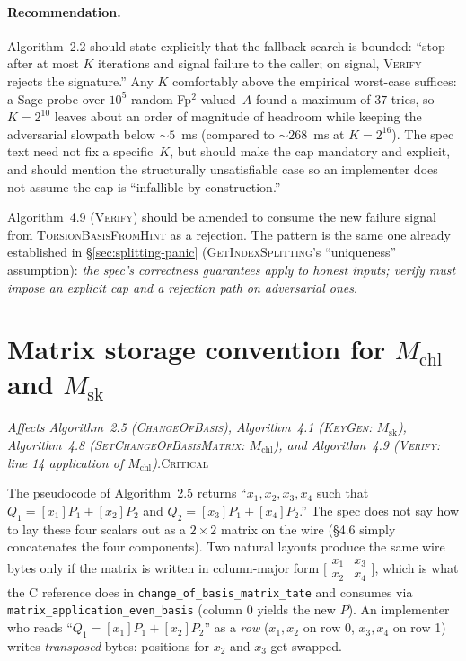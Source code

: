 \documentclass[a4paper,11pt]{article}
\newcommand{\algo}[1]{Algorithm~#1}
\newcommand{\critical}{\textsc{\color{BrickRed}Critical}}
\newcommand{\finding}[2]{\noindent\textit{#1}\hfill#2\par\smallskip}
\begin{document}
\paragraph{Recommendation.}
\algo{2.2} should state explicitly that the fallback search is
bounded: ``stop after at most $K$ iterations and signal failure to
the caller; on signal, \textsc{Verify} rejects the signature.''
Any $K$ comfortably above the empirical worst-case suffices: a
Sage probe over $10^5$ random Fp$^2$-valued~$A$ found a
maximum of $37$ tries, so $K = 2^{10}$ leaves about an order of
magnitude of headroom while keeping the adversarial slowpath
below ${\sim}5$~ms (compared to $\sim 268$~ms at $K = 2^{16}$).
The spec text need not fix a specific~$K$, but should make the
cap mandatory and explicit, and should mention the structurally
unsatisfiable case so an implementer does not assume the cap is
``infallible by construction.''

\algo{4.9} (\textsc{Verify}) should be amended to consume the new
failure signal from \textsc{TorsionBasisFromHint} as a rejection.
The pattern is the same one already established in
\S\ref{sec:splitting-panic} (\textsc{GetIndexSplitting}'s
``uniqueness'' assumption): \emph{the spec's correctness
guarantees apply to honest inputs; verify must impose an
explicit cap and a rejection path on adversarial ones}.

\section{Matrix storage convention for $M_{\mathrm{chl}}$ and $M_{\mathrm{sk}}$}
\label{sec:matrix-storage}

\finding{Affects \algo{2.5}
(\textsc{ChangeOfBasis}), \algo{4.1}
(\textsc{KeyGen}: $M_{\mathrm{sk}}$), \algo{4.8}
(\textsc{SetChangeOfBasisMatrix}: $M_{\mathrm{chl}}$), and \algo{4.9}
(\textsc{Verify}: line 14 application of $M_{\mathrm{chl}}$).}{\critical}

The pseudocode of \algo{2.5} returns ``$x_1, x_2, x_3, x_4$ such that
$Q_1 = [x_1] P_1 + [x_2] P_2$ and $Q_2 = [x_3] P_1 + [x_4] P_2$.''  The
spec does not say how to lay these four scalars out as a $2 \times 2$
matrix on the wire (\S4.6 simply concatenates the four components).
Two natural layouts produce the same wire bytes only if the matrix is
written in column-major form $\bigl[\begin{smallmatrix} x_1 & x_3 \\
x_2 & x_4 \end{smallmatrix}\bigr]$, which is what the C reference does
in \texttt{change\_of\_basis\_matrix\_tate} and consumes via
\texttt{matrix\_application\_even\_basis} (column 0 yields the new
$P$).  An implementer who reads ``$Q_1 = [x_1] P_1 + [x_2] P_2$'' as a
\emph{row} ($x_1, x_2$ on row 0, $x_3, x_4$ on row 1) writes
\emph{transposed} bytes: positions for $x_2$ and $x_3$ get swapped.
\end{document}
